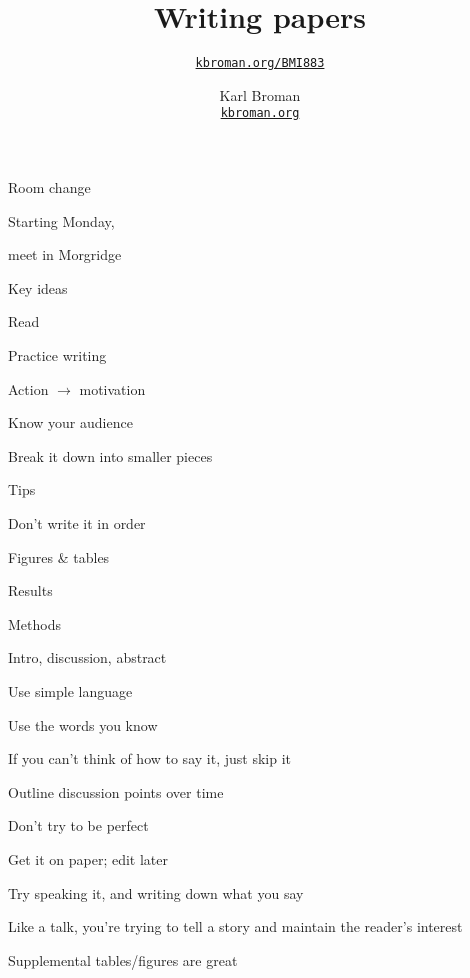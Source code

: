 \documentclass[aspectratio=169,12pt,t]{beamer}
\title{Writing papers}
\subtitle{}
\author{\href{https://kbroman.org/BMI883}{\tt kbroman.org/BMI883} }
\institute{}
\date{\small \hspace{3in} Karl Broman \\
  \hspace{3in} \href{https://kbroman.org}{\color{foreground}
    \small \tt kbroman.org}}
\begin{document}
{
\frame{
  \titlepage
} }



\begin{frame}[c]{Room change}

  \LARGE

  \centerline{Starting Monday,}

  \bigskip

  \centerline{meet in { Morgridge}}

\end{frame}




\begin{frame}{Key ideas}


  \bbi
\item Read
\item Practice writing
\item Action $\longrightarrow$ motivation
\item Know your audience
\item Break it down into smaller pieces
  \ei

\end{frame}




\begin{frame}{Tips}

      \bi
    \item Don't write it in order
      \bi
    \item Figures \& tables
    \item Results
    \item Methods
    \item Intro, discussion, abstract
      \ei
    \item Use simple language
      \bi
    \item Use the words you know
    \item If you can't think of how to say it, just skip it
      \ei
    \item Outline discussion points over time
    \item Don't try to be perfect
      \bi
    \item Get it on paper; edit later
      \ei
    \item Try speaking it, and writing down what you say
      \bi
      \item Like a talk, you're trying to tell a story and maintain
        the reader's interest
      \ei
    \item Supplemental tables/figures are great
    \ei


\end{frame}
\end{document}

